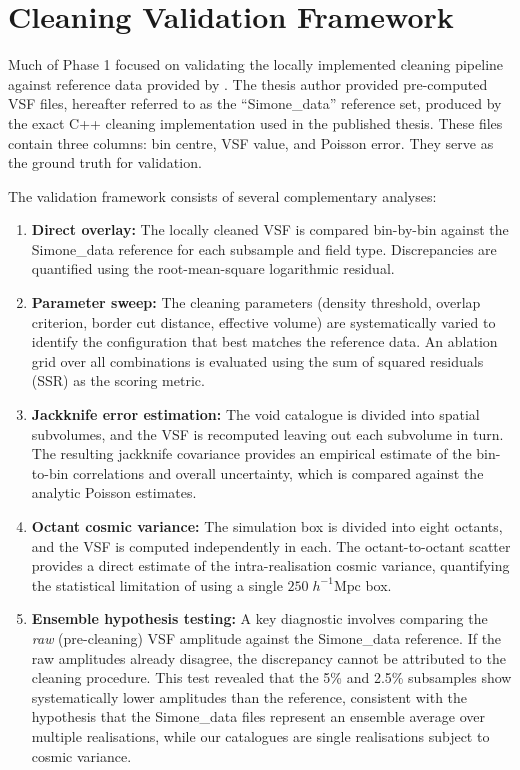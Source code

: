 \documentclass[12pt]{report}
\begin{document}
\section{Cleaning Validation Framework}
\label{sec:cleaning_validation}

Much of Phase 1 focused on validating the locally implemented cleaning pipeline against reference data provided by \citet{Sartori2025}. The thesis author provided pre-computed VSF files, hereafter referred to as the ``Simone\_data'' reference set, produced by the exact C++ cleaning implementation used in the published thesis. These files contain three columns: bin centre, VSF value, and Poisson error. They serve as the ground truth for validation.

The validation framework consists of several complementary analyses:

\begin{enumerate}
    \item \textbf{Direct overlay:} The locally cleaned VSF is compared bin-by-bin against the Simone\_data reference for each subsample and field type. Discrepancies are quantified using the root-mean-square logarithmic residual.

    \item \textbf{Parameter sweep:} The cleaning parameters (density threshold, overlap criterion, border cut distance, effective volume) are systematically varied to identify the configuration that best matches the reference data. An ablation grid over all combinations is evaluated using the sum of squared residuals (SSR) as the scoring metric.

    \item \textbf{Jackknife error estimation:} The void catalogue is divided into spatial subvolumes, and the VSF is recomputed leaving out each subvolume in turn. The resulting jackknife covariance provides an empirical estimate of the bin-to-bin correlations and overall uncertainty, which is compared against the analytic Poisson estimates.

    \item \textbf{Octant cosmic variance:} The simulation box is divided into eight octants, and the VSF is computed independently in each. The octant-to-octant scatter provides a direct estimate of the intra-realisation cosmic variance, quantifying the statistical limitation of using a single $250\;h^{-1}\mathrm{Mpc}$ box.

    \item \textbf{Ensemble hypothesis testing:} A key diagnostic involves comparing the \emph{raw} (pre-cleaning) VSF amplitude against the Simone\_data reference. If the raw amplitudes already disagree, the discrepancy cannot be attributed to the cleaning procedure. This test revealed that the 5\% and 2.5\% subsamples show systematically lower amplitudes than the reference, consistent with the hypothesis that the Simone\_data files represent an ensemble average over multiple realisations, while our catalogues are single realisations subject to cosmic variance.
\end{enumerate}
\end{document}
